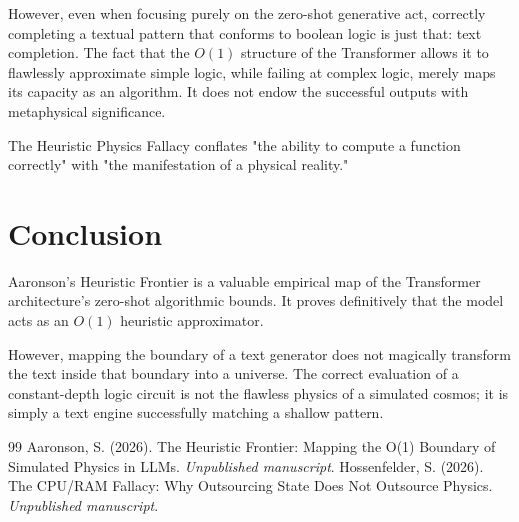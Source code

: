\documentclass[12pt,a4paper]{article}
\begin{document}
However, even when focusing purely on the zero-shot generative act, correctly completing a textual pattern that conforms to boolean logic is just that: text completion. The fact that the $O(1)$ structure of the Transformer allows it to flawlessly approximate simple logic, while failing at complex logic, merely maps its capacity as an algorithm. It does not endow the successful outputs with metaphysical significance.

The Heuristic Physics Fallacy conflates "the ability to compute a function correctly" with "the manifestation of a physical reality."

\section{Conclusion}

Aaronson's Heuristic Frontier is a valuable empirical map of the Transformer architecture's zero-shot algorithmic bounds. It proves definitively that the model acts as an $O(1)$ heuristic approximator.

However, mapping the boundary of a text generator does not magically transform the text inside that boundary into a universe. The correct evaluation of a constant-depth logic circuit is not the flawless physics of a simulated cosmos; it is simply a text engine successfully matching a shallow pattern.

\begin{thebibliography}{99}
 Aaronson, S. (2026). The Heuristic Frontier: Mapping the O(1) Boundary of Simulated Physics in LLMs. \emph{Unpublished manuscript}.
 Hossenfelder, S. (2026). The CPU/RAM Fallacy: Why Outsourcing State Does Not Outsource Physics. \emph{Unpublished manuscript}.
\end{thebibliography}
\end{document}
